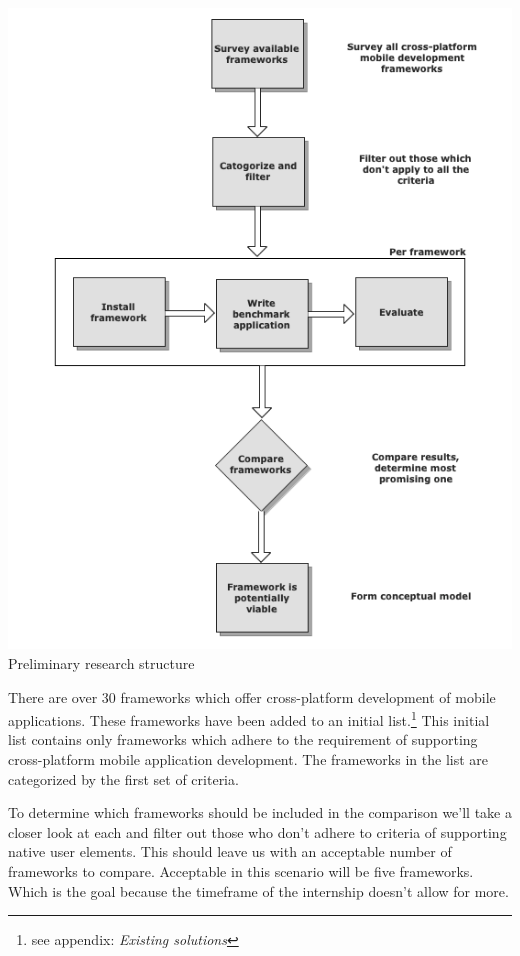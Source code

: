 \begin{centering}
\includegraphics[scale=0.6]{images/preliminary}\\{Preliminary research structure}\\
\end{centering}

There are over 30 frameworks which offer cross-platform development of mobile applications\cite{Wikipedia2012}. These frameworks have been added to an initial list.\footnote{see appendix: \emph{Existing solutions}} This initial list contains only frameworks which adhere to the requirement of supporting cross-platform mobile application development. The frameworks in the list are categorized by the first set of criteria.

To determine which frameworks should be included in the comparison we'll take a closer look at each and filter out those who don't adhere to criteria of supporting native user elements. This should leave us with an acceptable number of frameworks to compare. Acceptable in this scenario will be five frameworks. Which is the goal because the timeframe of the internship doesn't allow for more.



